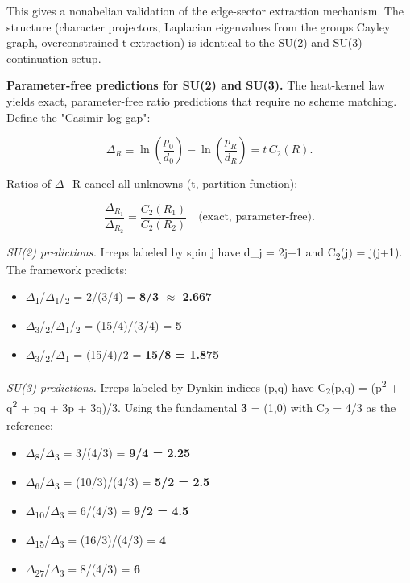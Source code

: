 This gives a nonabelian validation of the edge-sector extraction mechanism. The structure (character projectors, Laplacian eigenvalues from the group\textquotesingle s Cayley graph, overconstrained t extraction) is identical to the SU(2) and SU(3) continuation setup.

\textbf{Parameter-free predictions for SU(2) and SU(3).} The heat-kernel law yields exact, parameter-free ratio predictions that require no scheme matching. Define the "Casimir log-gap":

\[
\Delta_R \equiv \ln\left(\frac{p_0}{d_0}\right) - \ln\left(\frac{p_R}{d_R}\right)
= t \, C_2(R).
\]

Ratios of \ensuremath{\Delta}\_R cancel all unknowns (t, partition function):

\[
\frac{\Delta_{R_1}}{\Delta_{R_2}} = \frac{C_2(R_1)}{C_2(R_2)}
\quad \text{(exact, parameter-free).}
\]

\emph{SU(2) predictions.} Irreps labeled by spin j have d\_j = 2j+1 and C\textsubscript{2}(j) = j(j+1). The framework predicts:

\begin{itemize}
\tightlist
\item
  \ensuremath{\Delta}\textsubscript{1}/\ensuremath{\Delta}\textsubscript{1}/\textsubscript{2} = 2/(3/4) = \textbf{8/3 \ensuremath{\approx} 2.667}
\item
  \ensuremath{\Delta}\textsubscript{3}/\textsubscript{2}/\ensuremath{\Delta}\textsubscript{1}/\textsubscript{2} = (15/4)/(3/4) = \textbf{5}
\item
  \ensuremath{\Delta}\textsubscript{3}/\textsubscript{2}/\ensuremath{\Delta}\textsubscript{1} = (15/4)/2 = \textbf{15/8 = 1.875}
\end{itemize}

\emph{SU(3) predictions.} Irreps labeled by Dynkin indices (p,q) have C\textsubscript{2}(p,q) = (p\textsuperscript{2} + q\textsuperscript{2} + pq + 3p + 3q)/3. Using the fundamental \textbf{3} = (1,0) with C\textsubscript{2} = 4/3 as the reference:

\begin{itemize}
\tightlist
\item
  \ensuremath{\Delta}\textsubscript{8}/\ensuremath{\Delta}\textsubscript{3} = 3/(4/3) = \textbf{9/4 = 2.25}
\item
  \ensuremath{\Delta}\textsubscript{6}/\ensuremath{\Delta}\textsubscript{3} = (10/3)/(4/3) = \textbf{5/2 = 2.5}
\item
  \ensuremath{\Delta}\textsubscript{1}\textsubscript{0}/\ensuremath{\Delta}\textsubscript{3} = 6/(4/3) = \textbf{9/2 = 4.5}
\item
  \ensuremath{\Delta}\textsubscript{1}\textsubscript{5}/\ensuremath{\Delta}\textsubscript{3} = (16/3)/(4/3) = \textbf{4}
\item
  \ensuremath{\Delta}\textsubscript{2}\textsubscript{7}/\ensuremath{\Delta}\textsubscript{3} = 8/(4/3) = \textbf{6}
\end{itemize}

